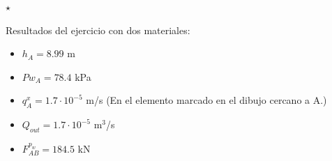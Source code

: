 \documentclass[a4paper,12pt]{article}
\begin{document}
\vspace{3mm}

\hspace{20mm}\hrulefill$\star$\hrulefill\hspace{20mm}

\vspace{3mm}


Resultados del ejercicio con dos materiales:
\begin{itemize}
\item $h_A = 8.99$ m
\item $Pw_A = 78.4$ kPa
\item $q^x_A = 1.7\cdot 10^{-5}$ m/s (En el elemento marcado en el dibujo cercano a A.)
\item $Q_{out} = 1.7\cdot 10^{-5}$ m$^3$/s
\item $F^{p_w}_{AB} = 184.5$ kN

\end{itemize}
\end{document}
